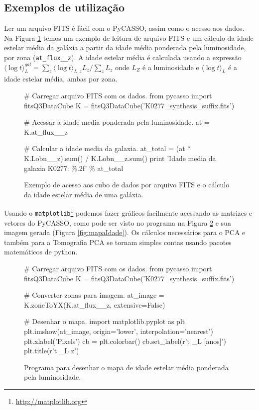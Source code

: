 \subsection{Exemplos de utilização}

Ler um arquivo FITS é fácil com o PyCASSO, assim como o acesso aos dados. Na
Figura \ref{fig:dataAccess} temos um exemplo de leitura de arquivo FITS e um
cálculo da idade estelar média da galáxia a partir da idade média ponderada pela
luminosidade, por zona (\texttt{at\_flux\_\_z}). A idade estelar média é
calculada usando a expressão $ \langle \log t \rangle^{gal}_L = \sum_z \langle
\log t \rangle_{L,z} L_z /\sum_z L_z$ onde $L_Z $ é a luminosidade e $ \langle
\log t \rangle_L $ é a idade estelar média, ambas por zona.

\begin{figure}
\begin{python}
# Carregar arquivo FITS com os dados.
from pycasso import fitsQ3DataCube
K = fitsQ3DataCube('K0277_synthesis_suffix.fits')

# Acessar a idade media ponderada pela luminosidade.
at = K.at_flux__z

# Calcular a idade media da galaxia.
at_total = (at * K.Lobn__z).sum() / K.Lobn__z.sum()
print 'Idade media da galaxia K0277: \%.2f' \% at_total
\end{python}
	\caption[Exemplo de programa utilizando PyCASSO]
	{Exemplo de acesso aos cubo de dados por arquivo FITS e o cálculo da idade
	estelar média de uma galáxia.}
	\label{fig:dataAccess}
\end{figure}

Usando o \texttt{matplotlib}\footnote{\url{http://matplotlib.org}} podemos fazer
gráficos facilmente acessando as matrizes e vetores do PyCASSO, como pode ser
visto no programa na Figura \ref{fig:programaMapaIdade} e sua imagem gerada
(Figura \ref{fig:mapaIdade}). Os cálculos necessários para o PCA e também para a
Tomografia PCA se tornam simples contas usando pacotes matemáticos de python.

\begin{figure}
\begin{python}
# Carregar arquivo FITS com os dados.
from pycasso import fitsQ3DataCube
K = fitsQ3DataCube('K0277_synthesis_suffix.fits')

# Converter zonas para imagem.
at_image = K.zoneToYX(K.at_flux__z, extensive=False)

# Desenhar o mapa.
import matplotlib.pyplot as plt
plt.imshow(at_image, origin='lower', interpolation='nearest')
plt.xlabel('Pixels')
cb = plt.colorbar()
cb.set_label(r'\langle \log t \langle_L [anos]')
plt.title(r'\langle \log t \langle_{L z}')

\end{python}
	\caption[Programa idade estelar média]
	{Programa para desenhar o mapa de idade	estelar média ponderada pela 
	luminosidade.}
	\label{fig:programaMapaIdade}
\end{figure}

